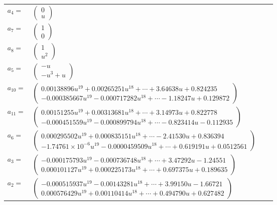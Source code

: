 \documentclass[1p]{elsarticle_modified}
\theoremstyle{definition}
\begin{document}
\begin{tabular}{m{7pt} m{180pt} m{7pt} m{180pt} }
\flushright $a_{4}=$&$\begin{pmatrix}0\\u\end{pmatrix}$ \\
\flushright $a_{7}=$&$\begin{pmatrix}1\\0\end{pmatrix}$ \\
\flushright $a_{8}=$&$\begin{pmatrix}1\\u^2\end{pmatrix}$ \\
\flushright $a_{5}=$&$\begin{pmatrix}- u\\- u^3+u\end{pmatrix}$ \\
\flushright $a_{10}=$&$\begin{pmatrix}0.00138896 u^{19}+0.00265251 u^{18}+\cdots+3.64638 u+0.824235\\-0.000385667 u^{19}-0.000717282 u^{18}+\cdots-1.18247 u+0.129872\end{pmatrix}$ \\
\flushright $a_{11}=$&$\begin{pmatrix}0.00151255 u^{19}+0.00313681 u^{18}+\cdots+3.14973 u+0.822778\\-0.000451559 u^{19}-0.000899794 u^{18}+\cdots-0.823414 u-0.112935\end{pmatrix}$ \\
\flushright $a_{6}=$&$\begin{pmatrix}0.000295502 u^{19}+0.000835151 u^{18}+\cdots-2.41530 u+0.836394\\-1.74761\times10^{-6} u^{19}-0.0000459509 u^{18}+\cdots+0.619191 u+0.0512561\end{pmatrix}$ \\
\flushright $a_{3}=$&$\begin{pmatrix}-0.000175793 u^{19}-0.000736748 u^{18}+\cdots+3.47292 u-1.24551\\0.000101127 u^{19}+0.000225173 u^{18}+\cdots+0.697375 u+0.189635\end{pmatrix}$ \\
\flushright $a_{2}=$&$\begin{pmatrix}-0.000515937 u^{19}-0.00143281 u^{18}+\cdots+3.99150 u-1.66721\\0.000576429 u^{19}+0.00110414 u^{18}+\cdots+0.494790 u+0.627482\end{pmatrix}$ \\

\end{tabular}
\end{document}

